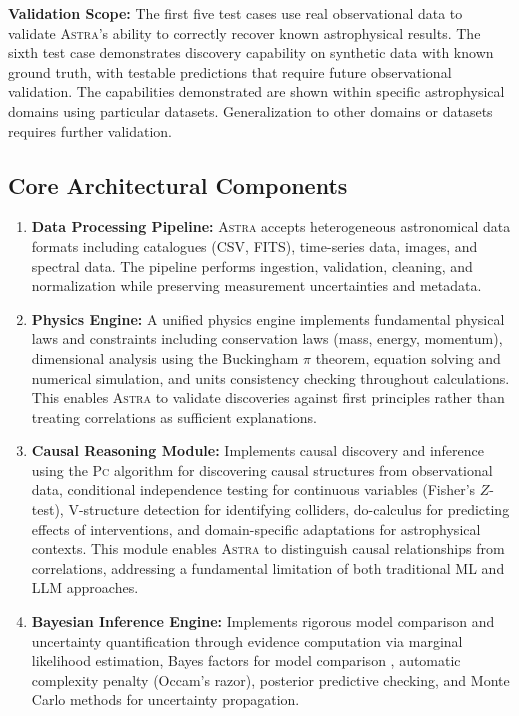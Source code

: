 \documentclass[fleqn,usenatbib]{mnras}
\newcommand{\astra}{\textsc{Astra}\xspace}
\newcommand{\pc}{\textsc{Pc}\xspace}
\begin{document}
\textbf{Validation Scope:}
The first five test cases use real observational data to validate \astra's ability to correctly recover known astrophysical results.
The sixth test case demonstrates discovery capability on synthetic data with known ground truth, with testable predictions that require future observational validation.
The capabilities demonstrated are shown within specific astrophysical domains using particular datasets.
Generalization to other domains or datasets requires further validation.

\subsection{Core Architectural Components}
\label{sec:methods:components}

\begin{enumerate}
  \item \textbf{Data Processing Pipeline:}
  \astra accepts heterogeneous astronomical data formats including catalogues (CSV, FITS), time-series data, images, and spectral data.
  The pipeline performs ingestion, validation, cleaning, and normalization while preserving measurement uncertainties and metadata.

  \item \textbf{Physics Engine:}
  A unified physics engine implements fundamental physical laws and constraints including conservation laws (mass, energy, momentum), dimensional analysis using the Buckingham $\pi$ theorem, equation solving and numerical simulation, and units consistency checking throughout calculations.
  This enables \astra to validate discoveries against first principles rather than treating correlations as sufficient explanations.

  \item \textbf{Causal Reasoning Module:}
  Implements causal discovery and inference using the \pc algorithm \citep{Spirtes2000} for discovering causal structures from observational data, conditional independence testing for continuous variables (Fisher's $Z$-test), V-structure detection for identifying colliders, do-calculus for predicting effects of interventions, and domain-specific adaptations for astrophysical contexts.
  This module enables \astra to distinguish causal relationships from correlations, addressing a fundamental limitation of both traditional ML and LLM approaches.

  \item \textbf{Bayesian Inference Engine:}
  Implements rigorous model comparison and uncertainty quantification through evidence computation via marginal likelihood estimation, Bayes factors for model comparison \citep{KassRaftery1995}, automatic complexity penalty (Occam's razor), posterior predictive checking, and Monte Carlo methods for uncertainty propagation.


\end{enumerate}
\end{document}
